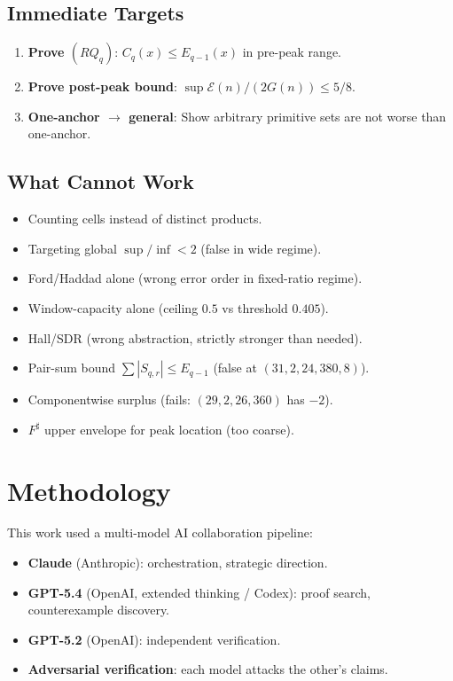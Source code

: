 \documentclass[11pt,a4paper]{article}
\theoremstyle{definition}
\begin{document}
\subsection{Immediate Targets}

\begin{enumerate}
\item \textbf{Prove $(RQ_q)$}: $C_q(x) \leq E_{q-1}(x)$ in pre-peak range.
\item \textbf{Prove post-peak bound}: $\sup \mathcal{E}(n)/(2G(n)) \leq 5/8$.
\item \textbf{One-anchor $\to$ general}: Show arbitrary primitive sets 
are not worse than one-anchor.
\end{enumerate}

\subsection{What Cannot Work}

\begin{itemize}
\item Counting cells instead of distinct products.
\item Targeting global $\sup/\inf < 2$ (false in wide regime).
\item Ford/Haddad alone (wrong error order in fixed-ratio regime).
\item Window-capacity alone (ceiling $0.5$ vs threshold $0.405$).
\item Hall/SDR (wrong abstraction, strictly stronger than needed).
\item Pair-sum bound $\sum |S_{q,r}| \leq E_{q-1}$ (false at $(31,2,24,380,8)$).
\item Componentwise surplus (fails: $(29,2,26,360)$ has $-2$).
\item $F^{\sharp}$ upper envelope for peak location (too coarse).
\end{itemize}

\section{Methodology}

This work used a multi-model AI collaboration pipeline:
\begin{itemize}
\item \textbf{Claude} (Anthropic): orchestration, strategic direction.
\item \textbf{GPT-5.4} (OpenAI, extended thinking / Codex): proof search, 
counterexample discovery.
\item \textbf{GPT-5.2} (OpenAI): independent verification.
\item \textbf{Adversarial verification}: each model attacks the other's claims.
\end{itemize}
\end{document}
